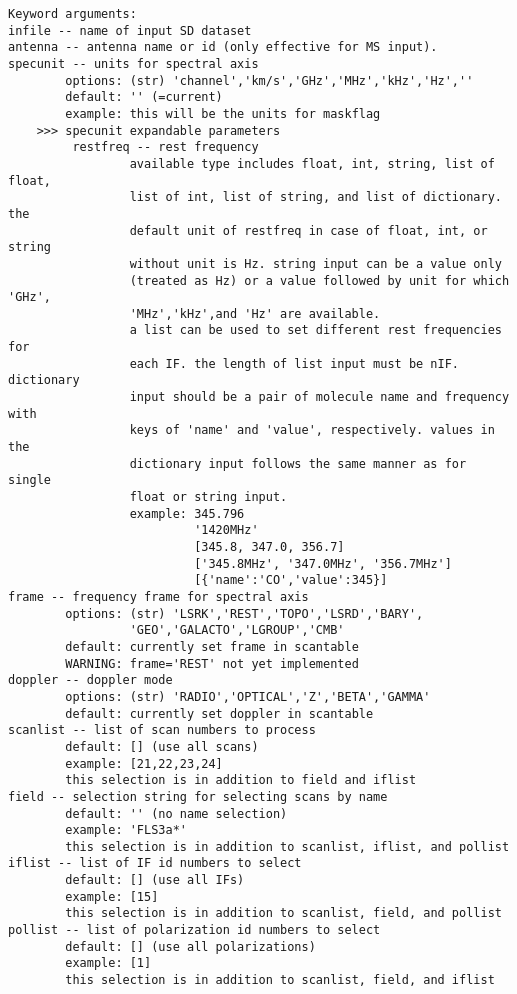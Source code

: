 \begin{verbatim}
Keyword arguments:
infile -- name of input SD dataset
antenna -- antenna name or id (only effective for MS input). 
specunit -- units for spectral axis
        options: (str) 'channel','km/s','GHz','MHz','kHz','Hz',''
        default: '' (=current)
        example: this will be the units for maskflag
    >>> specunit expandable parameters
         restfreq -- rest frequency
                 available type includes float, int, string, list of float, 
                 list of int, list of string, and list of dictionary. the 
                 default unit of restfreq in case of float, int, or string 
                 without unit is Hz. string input can be a value only 
                 (treated as Hz) or a value followed by unit for which 'GHz',
                 'MHz','kHz',and 'Hz' are available. 
                 a list can be used to set different rest frequencies for 
                 each IF. the length of list input must be nIF. dictionary 
                 input should be a pair of molecule name and frequency with 
                 keys of 'name' and 'value', respectively. values in the 
                 dictionary input follows the same manner as for single 
                 float or string input. 
                 example: 345.796
                          '1420MHz'
                          [345.8, 347.0, 356.7]
                          ['345.8MHz', '347.0MHz', '356.7MHz']
                          [{'name':'CO','value':345}]
frame -- frequency frame for spectral axis
        options: (str) 'LSRK','REST','TOPO','LSRD','BARY',
                 'GEO','GALACTO','LGROUP','CMB'
        default: currently set frame in scantable
        WARNING: frame='REST' not yet implemented
doppler -- doppler mode
        options: (str) 'RADIO','OPTICAL','Z','BETA','GAMMA'
        default: currently set doppler in scantable
scanlist -- list of scan numbers to process
        default: [] (use all scans)
        example: [21,22,23,24]
        this selection is in addition to field and iflist
field -- selection string for selecting scans by name
        default: '' (no name selection)
        example: 'FLS3a*'
        this selection is in addition to scanlist, iflist, and pollist
iflist -- list of IF id numbers to select
        default: [] (use all IFs)
        example: [15]
        this selection is in addition to scanlist, field, and pollist
pollist -- list of polarization id numbers to select
        default: [] (use all polarizations)
        example: [1]
        this selection is in addition to scanlist, field, and iflist

\end{verbatim}
